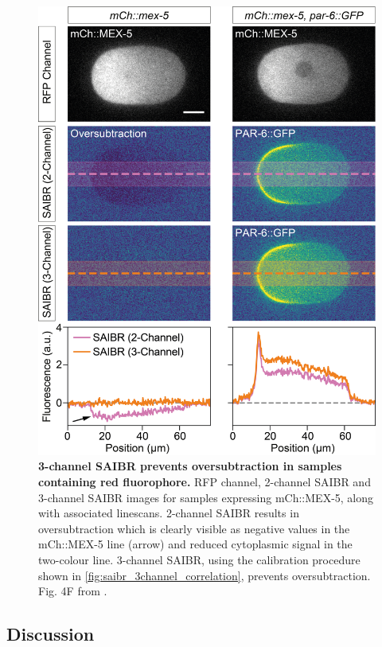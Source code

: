 \documentclass[12pt]{"report"}
\newcommand{\mycaption}[2]{\caption[#1]{\textbf{#1.} #2}}
\begin{document}
\begin{figure}
\includegraphics[scale=1]{saibr_3channel_correction}
\mycaption{3-channel SAIBR prevents oversubtraction in samples containing red fluorophore}{
RFP channel, 2-channel SAIBR and 3-channel SAIBR images for samples expressing mCh::MEX-5, along with associated linescans. 2-channel SAIBR results in oversubtraction which is clearly visible as negative values in the mCh::MEX-5 line (arrow) and reduced cytoplasmic signal in the two-colour line. 3-channel SAIBR, using the calibration procedure shown in \cref{fig:saibr_3channel_correlation}, prevents oversubtraction.
Fig. 4F from \textcite{Rodrigues2022}.}
\label{fig:saibr_3channel_correction}
\end{figure}


\subsection{Discussion}
\end{document}
